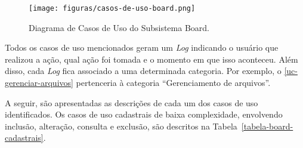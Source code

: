 \begin{figure}[h!]
	\centering
	\texttt{[image: figuras/casos-de-uso-board.png]}
	\caption{Diagrama de Casos de Uso do Subsistema Board.}
	\label{figura-caso-de-uso-board}
\end{figure}

Todos os casos de uso mencionados geram um \textit{Log} indicando o usuário que realizou a ação, qual ação foi tomada e o momento em que isso aconteceu. Além disso, cada \textit{Log} fica associado a uma determinada categoria. Por exemplo, o \ref{uc-gerenciar-arquivos} pertenceria à categoria ``Gerenciamento de arquivos''.

A seguir, são apresentadas as descrições de cada um dos casos de uso identificados. Os casos de uso cadastrais de baixa complexidade, envolvendo inclusão, alteração, consulta e exclusão, são descritos na Tabela~\ref{tabela-board-cadastrais}.


